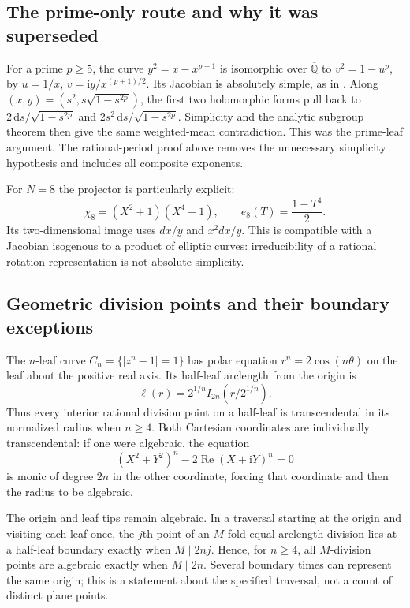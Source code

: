 \documentclass[11pt,a4paper]{article}
\numberwithin{equation}{section}
\theoremstyle{definition}
\theoremstyle{remark}
\newcommand{\Qb}{\overline{\mathbb Q}}
\newcommand{\dd}{\,\mathrm d}
\newcommand{\ii}{\mathrm i}
\begin{document}
\subsection{The prime-only route and why it was superseded}
For a prime $p\ge5$, the curve $y^2=x-x^{p+1}$ is isomorphic over $\Qb$ to
$v^2=1-u^p$, by $u=1/x$, $v=\ii y/x^{(p+1)/2}$. Its Jacobian is absolutely
simple, as in \cite[Proposition 4.8]{Tamiozzo}. Along
$(x,y)=(s^2,s\sqrt{1-s^{2p}})$, the first two holomorphic forms pull back to
$2\dd s/\sqrt{1-s^{2p}}$ and
$2s^2\dd s/\sqrt{1-s^{2p}}$. Simplicity and the analytic subgroup theorem
then give the same weighted-mean contradiction. This was the prime-leaf
argument. The rational-period proof above removes the unnecessary
simplicity hypothesis and includes all composite exponents.

For $N=8$ the projector is particularly explicit:
\[
 \chi_8=(X^2+1)(X^4+1),\qquad e_8(T)=\frac{1-T^4}{2}.
\]
Its two-dimensional image uses $dx/y$ and $x^2dx/y$. This is compatible
with a Jacobian isogenous to a product of elliptic curves: irreducibility
of a rational rotation representation is not absolute simplicity.

\subsection{Geometric division points and their boundary exceptions}
The $n$-leaf curve $C_n=\{|z^n-1|=1\}$ has polar equation
$r^n=2\cos(n\theta)$ on the leaf about the positive real axis.
Its half-leaf arclength from the origin is
\begin{equation}\label{eq:leaf-length}
 \ell(r)=2^{1/n}I_{2n}(r/2^{1/n}).
\end{equation}
Thus every interior rational division point on a half-leaf is transcendental
in its normalized radius when $n\ge4$. Both Cartesian coordinates are
individually transcendental: if one were algebraic, the equation
\[
 (X^2+Y^2)^n-2\operatorname{Re}(X+\ii Y)^n=0
\]
is monic of degree $2n$ in the other coordinate, forcing that coordinate
and then the radius to be algebraic.

The origin and leaf tips remain algebraic. In a traversal starting at the
origin and visiting each leaf once, the $j$th point of an $M$-fold equal
arclength division lies at a half-leaf boundary exactly when
$M\mid2nj$. Hence, for $n\ge4$, all $M$-division points are algebraic
exactly when $M\mid2n$. Several boundary times can represent the same origin;
this is a statement about the specified traversal, not a count of distinct
plane points.
\end{document}
